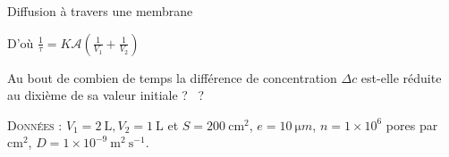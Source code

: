 \begin{exo}[PC][3][colle]{Diffusion à travers une membrane}
\begin{quest}
{D'où $\frac{1}{\tau}=K \mathscr{A}\left(\frac{1}{V_{1}}+\frac{1}{V_{2}}\right)$
  }

    \item Au bout de combien de temps la différence de concentration $\Delta c$ est-elle réduite au dixième de sa valeur initiale ? \AN~?

  \textsc{Données} : $V_{1}=2 \mathrm{~L}, V_{2}=1 \mathrm{~L}$ et $S=200 \mathrm{~cm}^{2}$, $e=\SI{10}{\micro m}$,  $n=1 \times 10^{6}$ pores par $\mathrm{cm}^{2}$, $D=1 \times 10^{-9} \mathrm{~m}^{2} \mathrm{~s}^{-1}$.
\end{quest}

\end{exo}

